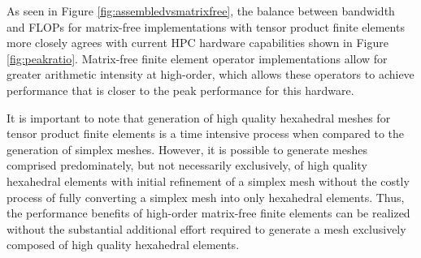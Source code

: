 As seen in Figure \ref{fig:assembledvsmatrixfree}, the balance between bandwidth and FLOPs for matrix-free implementations with tensor product finite elements more closely agrees with current HPC hardware capabilities shown in Figure \ref{fig:peakratio}.
Matrix-free finite element operator implementations allow for greater arithmetic intensity at high-order, which allows these operators to achieve performance that is closer to the peak performance for this hardware.

It is important to note that generation of high quality hexahedral meshes for tensor product finite elements is a time intensive process when compared to the generation of simplex meshes.
However, it is possible to generate meshes comprised predominately, but not necessarily exclusively, of high quality hexahedral elements with initial refinement of a simplex mesh without the costly process of fully converting a simplex mesh into only hexahedral elements.
Thus, the performance benefits of high-order matrix-free finite elements can be realized without the substantial additional effort required to generate a mesh exclusively composed of high quality hexahedral elements.
